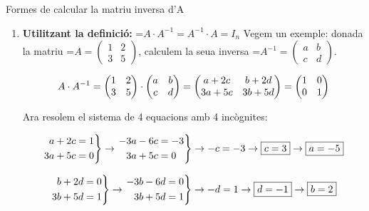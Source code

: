 \documentclass[11pt,a4paper]{article}
\newcommand{\fmm}[1]{\setbox0=\hbox{$#1$}\ifdim\wd0>\linewidth\fmdisp{#1}\else\mbox{\box0}\fi}
\newcommand{\fmdisp}[1]{\[\setbox2=\hbox{$\displaystyle #1$}\ifdim\wd2>\linewidth\resizebox{\linewidth}{!}{\box2}\else\box2\fi\]}
\begin{document}
\begin{fmex}{Formes de calcular la matriu inversa d'A}
\begin{enumerate}[label=\textbf{\arabic*.},leftmargin=*]
\item \textbf{Utilitzant la definició:} \fmm{A\cdot A^{-1}=A^{-1}\cdot A=I_n}\newline
          Vegem un exemple: donada la matriu \fmm{A=\begin{pmatrix}1 & 2\\ 3 & 5\end{pmatrix}}, calculem la seua inversa \fmm{A^{-1}=\begin{pmatrix}a & b\\ c & d\end{pmatrix}}.

\fmdisp{A\cdot A^{-1}=\begin{pmatrix}1 & 2\\ 3 & 5\end{pmatrix}\cdot\begin{pmatrix}a & b\\ c & d\end{pmatrix}=\begin{pmatrix}a+2c & b+2d\\ 3a+5c & 3b+5d\end{pmatrix}=\begin{pmatrix}1 & 0\\ 0 & 1\end{pmatrix}}

Ara resolem el sistema de 4 equacions amb 4 incògnites:

\fmdisp{\left.\begin{aligned}a+2c&=1\\ 3a+5c&=0\end{aligned}\right\}\rightarrow\left.\begin{aligned}-3a-6c&=-3\\ 3a+5c&=0\end{aligned}\right\}\rightarrow-c=-3\rightarrow\boxed{c=3}\rightarrow\boxed{a=-5}}

\fmdisp{\left.\begin{aligned}b+2d&=0\\ 3b+5d&=1\end{aligned}\right\}\rightarrow\left.\begin{aligned}-3b-6d&=0\\ 3b+5d&=1\end{aligned}\right\}\rightarrow-d=1\rightarrow\boxed{d=-1}\rightarrow\boxed{b=2}}


\end{enumerate}
\end{fmex}
\end{document}
